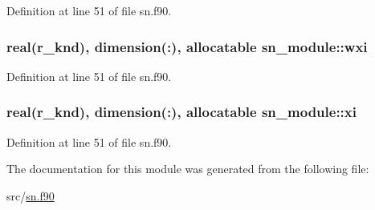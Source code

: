 Definition at line 51 of file sn.\-f90.

\hypertarget{classsn__module_aa6da1bff94a27edddbf1b18657999c43}{
\subsubsection[{wxi}]{\setlength{\rightskip}{0pt plus 5cm}real(r\-\_\-knd), dimension(\-:), allocatable sn\-\_\-module\-::wxi}}\label{classsn__module_aa6da1bff94a27edddbf1b18657999c43}


Definition at line 51 of file sn.\-f90.

\hypertarget{classsn__module_ab5621b664bb7f8eb4a3344d4158791a8}{
\subsubsection[{xi}]{\setlength{\rightskip}{0pt plus 5cm}real(r\-\_\-knd), dimension(\-:), allocatable sn\-\_\-module\-::xi}}\label{classsn__module_ab5621b664bb7f8eb4a3344d4158791a8}


Definition at line 51 of file sn.\-f90.



The documentation for this module was generated from the following file\-:\begin{DoxyCompactItemize}
\item 
src/\hyperlink{sn_8f90}{sn.\-f90}\end{DoxyCompactItemize}
